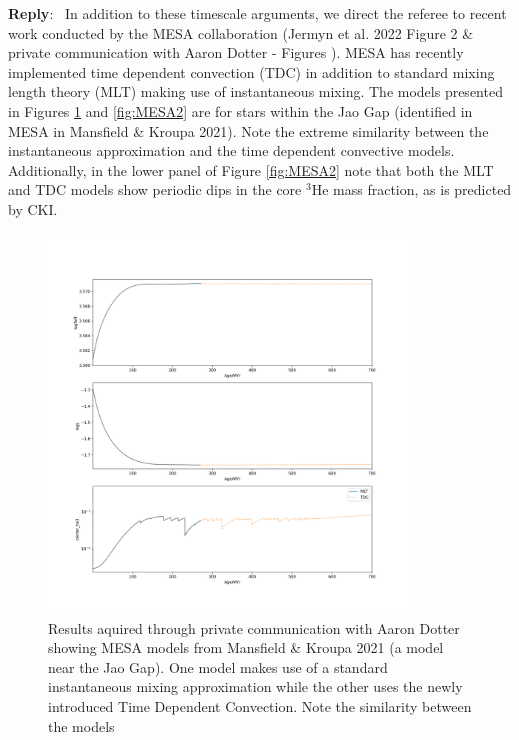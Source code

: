 \documentclass[11pt]{article}
\newenvironment{reply}
   {\medskip \noindent \begin{sf}\textbf{Reply}:\  }
   {\medskip \end{sf}}
\begin{document}
\begin{reply}
	In addition to these timescale arguments, we direct the referee to recent
	work conducted by the MESA collaboration (Jermyn et al. 2022 Figure 2 \&
	private communication with Aaron Dotter - Figures ). MESA has recently
	implemented time dependent convection (TDC) in addition to standard mixing
	length theory (MLT) making use of instantaneous mixing. The models
	presented in Figures \ref{fig:MESA1} and \ref{fig:MESA2} are for stars
	within the Jao Gap (identified in MESA in Mansfield \& Kroupa 2021). Note
	the extreme similarity between the instantaneous approximation and the time
	dependent convective models. Additionally, in the lower panel of Figure \ref{fig:MESA2}
	note that both the MLT and TDC models show periodic dips in the core $^{3}$He
	mass fraction, as is predicted by CKI.

	\begin{figure}
		\centering
		\includegraphics[width=0.85\textwidth]{./Figure_4.png}
		\caption{Results aquired through private communication with Aaron Dotter showing
		MESA models from Mansfield \& Kroupa 2021 (a model near the Jao Gap). One
		model makes use of a standard instantaneous mixing approximation while the other
		uses the newly introduced Time Dependent Convection. Note the similarity between the
		models}
		\label{fig:MESA1}
	\end{figure}
	\begin{figure}
		\centering

\end{figure}
\end{reply}
\end{document}
